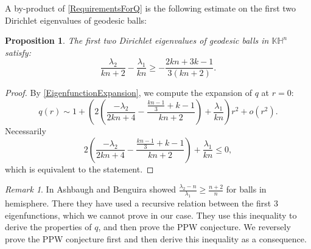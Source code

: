 \documentclass{amsart}
\numberwithin{equation}{section}
\theoremstyle{plain}
\newtheorem{prop}[theorem]{Proposition}
\theoremstyle{definition}
\theoremstyle{remark}
\newtheorem{remark}{Remark}[section]
\def\RR {\mathbb{R}}
\def\KK {\mathbb{K}}
\def\CC {\mathbb{C}}
\def\HH {\mathbb{H}}
\begin{document}
A by-product of \cref{RequirementsForQ} is the following estimate on the first two Dirichlet eigenvalues of geodesic balls:
\begin{prop}
    The first two Dirichlet eigenvalues of geodesic balls in $\KK\HH^n$ satisfy:
    \[\frac{\lambda_2}{kn+2}-\frac{\lambda_1}{kn}\geq -\frac{2kn+3k-1}{3(kn+2)}.\]
\end{prop}
\begin{proof}
    By \cref{EigenfunctionExpansion}, we compute the expansion of $q$ at $r=0$:
    \[q(r) \sim 1+\left(2(\frac{-\lambda_2}{2kn+4}-\frac{\frac{kn-1}{3}+k-1}{kn+2})+\frac{\lambda_1}{kn}\right)r^2+o(r^2).\]
    Necessarily \[2(\frac{-\lambda_2}{2kn+4}-\frac{\frac{kn-1}{3}+k-1}{kn+2})+\frac{\lambda_1}{kn}\leq 0,\] which is equivalent to the statement.
\end{proof}
\begin{remark}
    In \cite[Theorem 3.1]{ashbaugh2001sharp} Ashbaugh and Benguira showed $\frac{\lambda_2-n}{\lambda_1} \geq \frac{n+2}{n}$ for balls in hemisphere. There they have used a recursive relation between the first 3 eigenfunctions, which we cannot prove in our case. They use this inequality to derive the properties of $q$, and then prove the PPW conjecture. We reversely prove the PPW conjecture first and then derive this inequality as a consequence.
\end{remark}
\end{document}
